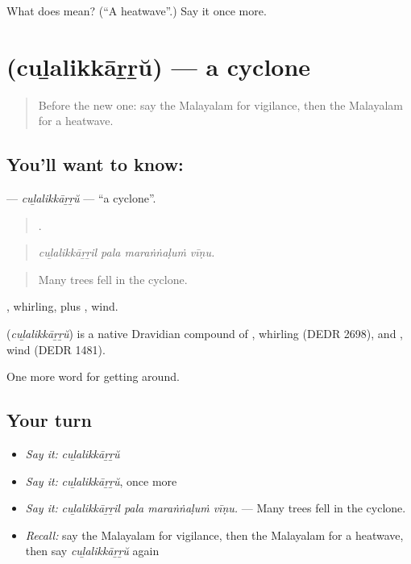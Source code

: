 \begin{tcolorbox}[breakable,colback=teal!4,colframe=teal!35!black,title={Before you move on}]
What does  mean? (\textquotedblleft{}A heatwave\textquotedblright{}.) Say it once more.
\end{tcolorbox}
\section[\texorpdfstring{\ml{ചുഴലിക്കാറ്റ്} (cuḻalikkāṟṟŭ)}{ചുഴലിക്കാറ്റ് (cuḻalikkāṟṟŭ)}]{ (cuḻalikkāṟṟŭ) — a cyclone}

\label{lesson:ML-C511-culalikkarru}



\begin{quote}
Before the new one: say the Malayalam for vigilance, then the Malayalam for a heatwave.
\end{quote}

\subsection*{You'll want to know: }
\textbf{} — \emph{cuḻalikkāṟṟŭ} — \textquotedblleft{}a cyclone\textquotedblright{}.

\begin{quote}
   .
\end{quote}

\begin{quote}
\emph{cuḻalikkāṟṟil pala maraṅṅaḷuṁ vīṇu.}
\end{quote}

\begin{quote}
Many trees fell in the cyclone.
\end{quote}

, whirling, plus , wind.

\begin{cousinweb}
\textbf{} (\emph{cuḻalikkāṟṟŭ}) is a native Dravidian compound of , whirling (DEDR 2698), and , wind (DEDR 1481).
\end{cousinweb}

\begin{grammarlens}[title={What you've built}]
One more word for getting around.
\end{grammarlens}

\subsection*{Your turn}
\begin{itemize}
\raggedright
  \item \emph{Say it:} \emph{cuḻalikkāṟṟŭ}
  \item \emph{Say it:} \emph{cuḻalikkāṟṟŭ}, once more
  \item \emph{Say it:} \emph{cuḻalikkāṟṟil pala maraṅṅaḷuṁ vīṇu.} — Many trees fell in the cyclone.
  \item \emph{Recall:} say the Malayalam for vigilance, then the Malayalam for a heatwave, then say \emph{cuḻalikkāṟṟŭ} again
\end{itemize}

